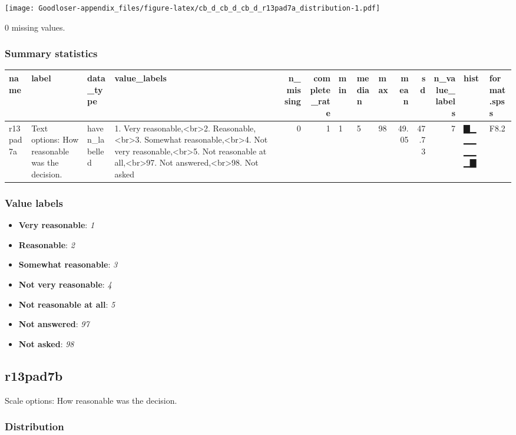 \documentclass[
]{book}
\providecommand{\tightlist}{%
  \setlength{\itemsep}{0pt}\setlength{\parskip}{0pt}}
\begin{document}
\texttt{[image: Goodloser-appendix\_files/figure-latex/cb\_d\_cb\_d\_cb\_d\_r13pad7a\_distribution-1.pdf]}

0 missing values.

\hypertarget{r13pad7a_summary}{%
\subsubsection{Summary statistics}\label{r13pad7a_summary}}

\begin{tabular}{l|l|l|l|r|r|l|l|l|r|r|r|l|l}
\hline
name & label & data_type & value_labels & n_missing & complete_rate & min & median & max & mean & sd & n_value_labels & hist & format.spss\\
\hline
r13pad7a & Text options: How reasonable was the decision. & haven_labelled & 1. Very reasonable,<br>2. Reasonable,<br>3. Somewhat reasonable,<br>4. Not very reasonable,<br>5. Not reasonable at all,<br>97. Not answered,<br>98. Not asked & 0 & 1 & 1 & 5 & 98 & 49.05 & 47.73 & 7 & ▇▁▁▁▁▁▁▇ & F8.2\\
\hline
\end{tabular}

\hypertarget{r13pad7a_labels}{%
\subsubsection{Value labels}\label{r13pad7a_labels}}

\begin{itemize}
\tightlist
\item
  \textbf{Very reasonable}: \emph{1}
\item
  \textbf{Reasonable}: \emph{2}
\item
  \textbf{Somewhat reasonable}: \emph{3}
\item
  \textbf{Not very reasonable}: \emph{4}
\item
  \textbf{Not reasonable at all}: \emph{5}
\item
  \textbf{Not answered}: \emph{97}
\item
  \textbf{Not asked}: \emph{98}
\end{itemize}

\hypertarget{r13pad7b}{%
\subsection{r13pad7b}\label{r13pad7b}}

Scale options: How reasonable was the decision.

\hypertarget{r13pad7b_distribution}{%
\subsubsection{Distribution}\label{r13pad7b_distribution}}
\end{document}
